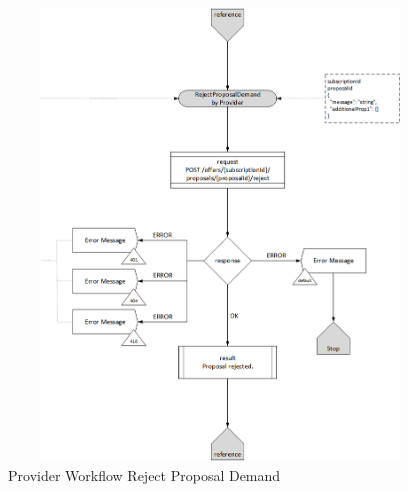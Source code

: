 \begin{enumerate}
\begin{figure}[htbp]
    \centering
    \includegraphics[width=12cm,height=12cm,angle=0]{./diag/Workflow/Market/RejectProposalDemand-P-Workflow.png}
    \caption{Provider Workflow Reject Proposal Demand }
	\label{fig:RPD}
\end{figure}


\end{enumerate}

\newpage




